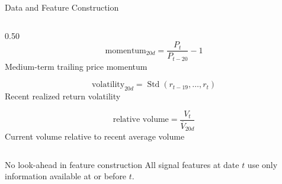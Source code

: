 \documentclass[10pt,aspectratio=169]{beamer}
\begin{document}
\begin{frame}{Data and Feature Construction}
\begin{columns}[T]
\begin{column}{0.50\textwidth}
\[
\text{momentum}_{20d}
=
\frac{P_t}{P_{t-20}}-1
\]
{\scriptsize Medium-term trailing price momentum}

\vspace{0.12cm}

\[
\text{volatility}_{20d}
=
\operatorname{Std}
(r_{t-19},\ldots,r_t)
\]
{\scriptsize Recent realized return volatility}

\vspace{0.12cm}

\[
\text{relative volume}
=
\frac{V_t}{\overline{V}_{20d}}
\]
{\scriptsize Current volume relative to recent average volume}

\vspace{0.15cm}


\end{column}

\end{columns}

\vspace{0.2cm}

\begin{block}{No look-ahead in feature construction}
All signal features at date $t$ use only information available
at or before $t$.
\end{block}

\end{frame}
\end{document}
